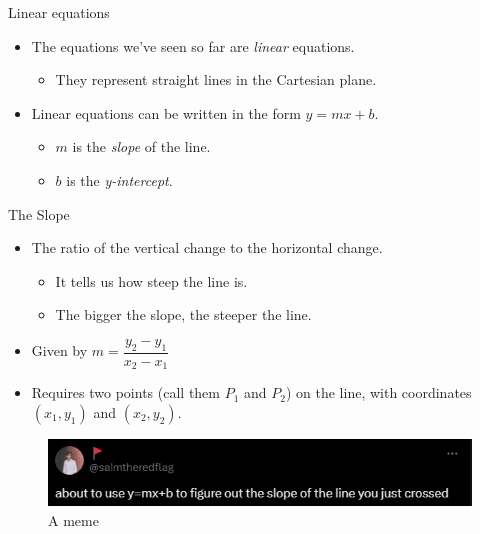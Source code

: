 \documentclass[
  10pt,
  ignorenonframetext,
]{beamer}
\providecommand{\tightlist}{%
  \setlength{\itemsep}{0pt}\setlength{\parskip}{0pt}}\usepackage{longtable,booktabs,array}
\begin{document}
\begin{frame}{Linear equations}
\label{linear-equations}
\begin{itemize}
\tightlist
\item
  The equations we've seen so far are \emph{linear} equations.

  \begin{itemize}
  \tightlist
  \item
    They represent straight lines in the Cartesian plane.
  \end{itemize}
\item
  Linear equations can be written in the form \(y = mx + b\).

  \begin{itemize}
  \tightlist
  \item
    \(m\) is the \emph{slope} of the line.
  \item
    \(b\) is the \emph{y-intercept}.
  \end{itemize}
\end{itemize}
\end{frame}

\begin{frame}{The Slope}
\label{the-slope}
\begin{itemize}
\item
  The ratio of the vertical change to the horizontal change.

  \begin{itemize}
  \tightlist
  \item
    It tells us how steep the line is.
  \item
    The bigger the slope, the steeper the line.
  \end{itemize}
\item
  Given by \(m = \dfrac{y_2 - y_1}{x_2 - x_1}\)
\item
  Requires two points (call them \(P_1\) and \(P_2\)) on the line, with
  coordinates \((x_1, y_1)\) and \((x_2, y_2)\).
\end{itemize}

\begin{figure}[H]

{\centering \includegraphics[width=\textwidth,height=0.65\textheight]{img/slope.png}

}

\caption{A meme}

\end{figure}%
\end{frame}
\end{document}
